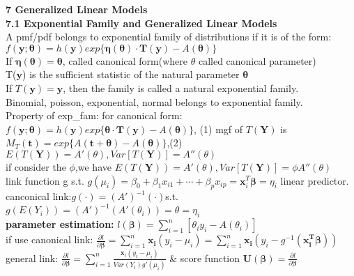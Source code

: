 \documentclass[10pt,a4paper,landscape]{article}
\begin{document}
\begin{multicols}{3}
{   
   
   
   {\small\textbf{7 Generalized Linear Models}}\\
   \textbf{7.1 Exponential Family and Generalized Linear Models}\\
   A pmf/pdf belongs to exponential family of distributions if it is of the form: $f(\boldsymbol{y};\boldsymbol{\theta})=h(\boldsymbol{y})exp\{\boldsymbol{\eta}(\boldsymbol{\theta})\cdot \boldsymbol{T}(\boldsymbol{y})-A(\boldsymbol{\theta}) \}$\\
   If $\boldsymbol{\eta}(\boldsymbol{\theta})=\boldsymbol{\theta}$, called canonical form(where $\theta$ called canonical parameter)\\
   T($\boldsymbol{y}$) is the sufficient statistic of the natural parameter $\boldsymbol{\theta}$\\
   If $T(\boldsymbol{y})=\boldsymbol{y}$, then the family is called a natural exponential family.\\
   Binomial, poisson, exponential, normal belongs to exponential family.\\
   Property of exp\_fam: for canonical form:$f(\boldsymbol{y};\boldsymbol{\theta})=h(\boldsymbol{y})exp\{\boldsymbol{\theta}\cdot \boldsymbol{T}(\boldsymbol{y})-A(\boldsymbol{\theta}) \}$, (1) mgf of $T(\boldsymbol{Y})$ is $M_T(\boldsymbol{t})=exp\{A(\boldsymbol{t+\theta})-A(\boldsymbol{\theta}) \}$,(2)$E(T(\boldsymbol{Y}))=A'(\theta), Var[T(\boldsymbol{Y})]=A''(\theta)$\\
   if consider the $\phi$,we have $E(T(\boldsymbol{Y}))=A'(\theta), Var[T(\boldsymbol{Y})]=\phi A''(\theta)$\\
   link function g s.t. $g(\mu_i)=\beta_0+\beta_1x_{i1}+\cdots+\beta_px_{ip}=\boldsymbol{x}_i^T \boldsymbol{\beta}=\eta_i$ linear predictor.\\
   canconical link:$g(\cdot)=(A')^{-1}(\cdot)$s.t.$g(E(Y_i))=(A')^{-1}(A'(\theta_i))=\theta=\eta_i$\\
   \textbf{parameter estimation:} $l(\boldsymbol{\beta})=\sum_{i=1}^n[\theta_iy_i-A(\theta_i)]$\\
   if use canonical link: $\frac{\partial l}{\partial \boldsymbol{\beta}}=\sum_{i=1}^n \boldsymbol{x_i}(y_i-\mu_i)=\sum_{i=1}^n \boldsymbol{x_i}(y_i-g^{-1}(\boldsymbol{x_i^T\beta})) $\\
   general link: $\frac{\partial l}{\partial \boldsymbol{\beta}}=\sum_{i=1}^n \frac{\boldsymbol{x}_i (y_i-\mu_i)}{Var(Y_i)g'(\mu_i)} $ \& score function $\boldsymbol{U(\beta)}=\frac{\partial l}{\partial \boldsymbol{\beta}}$ \\
}
\end{multicols}
\end{document}
